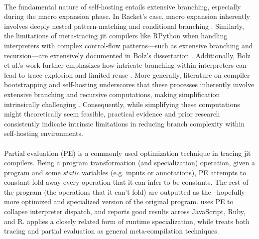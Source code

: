   \paragraph{}%
    The fundamental nature of self-hosting entails extensive branching, especially during the macro expansion phase. In Racket's case, macro expansion inherently involves deeply nested pattern-matching and conditional branching \cite{icfp2019}. Similarly, the limitations of meta-tracing \gls{jit} compilers like RPython when handling interpreters with complex control-flow patterns—such as extensive branching and recursion—are extensively documented in Bolz's dissertation \cite{bolzPhDThesis}. Additionally, Bolz et al.'s work further emphasizes how intricate branching within interpreters can lead to trace explosion and limited reuse \cite{pypy-main}. More generally, literature on compiler bootstrapping and self-hosting underscores that these processes inherently involve extensive branching and recursive computations, making simplification intrinsically challenging \cite{appelCompilingContinuations2007}. Consequently, while simplifying these computations might theoretically seem feasible, practical evidence and prior research consistently indicate intrinsic limitations in reducing branch complexity within self-hosting environments.


  \paragraph{}%
    Partial evaluation (PE) is a commonly used optimization technique in tracing \gls{jit} compilers. Being a program transformation (and specialization) operation, given a program and some \emph{static} variables (e.g. inputs or annotations), PE attempts to constant-fold away every operation that it can infer to be constants. The rest of the program (the operations that it can't fold) are outputted as the --hopefully-- more optimized and specialized version of the original program. \cite{truffle-graal} uses PE to collapse interpreter dispatch, and \cite{practical-partial} reports good results across JavaScript, Ruby, and R.  \cite{traceMonkey} applies a closely related form of runtime specialization, while \cite{trace-vs-PE} treats both tracing and partial evaluation as general meta-compilation techniques.

